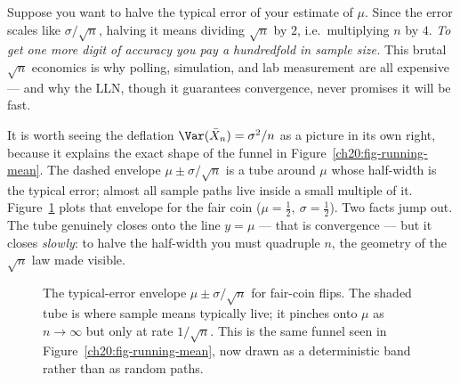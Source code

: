 \begin{walkbox}
Suppose you want to halve the typical error of your estimate of $\mu$. Since the error scales like $\sigma/\sqrt n$, halving it means dividing $\sqrt n$ by $2$, i.e.\ multiplying $n$ by $4$. \emph{To get one more digit of accuracy you pay a hundredfold in sample size.} This brutal $\sqrt n$ economics is why polling, simulation, and lab measurement are all expensive --- and why the LLN, though it guarantees convergence, never promises it will be fast.
\end{walkbox}

It is worth seeing the deflation $\Var(\bar X_n) = \sigma^2/n$ as a picture in its own right, because it explains the exact shape of the funnel in Figure~\ref{ch20:fig-running-mean}. The dashed envelope $\mu \pm \sigma/\sqrt n$ is a tube around $\mu$ whose half-width is the typical error; almost all sample paths live inside a small multiple of it. Figure~\ref{ch20:fig-funnel} plots that envelope for the fair coin ($\mu=\tfrac12,\ \sigma=\tfrac12$). Two facts jump out. The tube genuinely closes onto the line $y=\mu$ --- that is convergence --- but it closes \emph{slowly}: to halve the half-width you must quadruple $n$, the geometry of the $\sqrt n$ law made visible.

\begin{figure}[H]
\centering
{}
\caption{The typical-error envelope $\mu \pm \sigma/\sqrt n$ for fair-coin flips. The shaded tube is where sample means typically live; it pinches onto $\mu$ as $n\to\infty$ but only at rate $1/\sqrt n$. This is the same funnel seen in Figure~\ref{ch20:fig-running-mean}, now drawn as a deterministic band rather than as random paths.}
\label{ch20:fig-funnel}
\end{figure}

